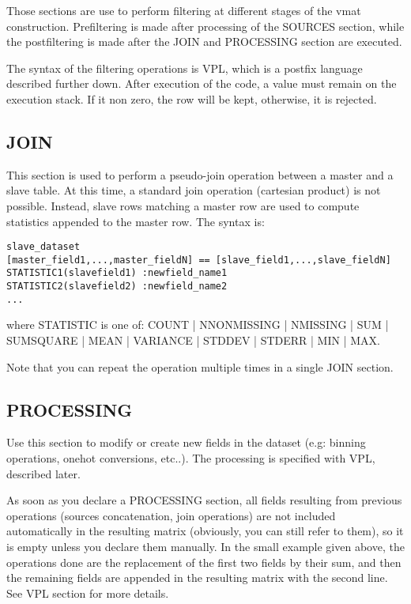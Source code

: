 \documentclass[11pt]{book}
\begin{document}
Those sections are use to perform filtering at different stages of the vmat construction. Prefiltering is made after processing of the SOURCES section, while the postfiltering is made after the JOIN and PROCESSING section are executed. 

The syntax of the filtering operations is VPL, which is a postfix language described further down. After execution of the code, a value must remain on the execution stack. If it non zero, the row will be kept, otherwise, it is rejected.

\subsection{JOIN}

This section is used to perform a pseudo-join operation between a master and a slave table. At this time, a standard join operation (cartesian product) is not possible. Instead, slave rows matching a master row are used to compute statistics appended to the master row. The syntax is:

\begin{verbatim}
slave_dataset
[master_field1,...,master_fieldN] == [slave_field1,...,slave_fieldN]
STATISTIC1(slavefield1) :newfield_name1
STATISTIC2(slavefield2) :newfield_name2
...
\end{verbatim}
where STATISTIC is one of: {COUNT | NNONMISSING | NMISSING | SUM | SUMSQUARE | MEAN | VARIANCE | STDDEV | STDERR | MIN | MAX}. 

Note that you can repeat the operation multiple times in a single JOIN section.

\subsection{PROCESSING}
Use this section to modify or create new fields in the dataset (e.g: binning operations, onehot conversions, etc..). The processing is specified with VPL, described later.

As soon as you declare a PROCESSING section, all fields resulting from previous operations (sources concatenation, join operations) are not included automatically in the resulting matrix (obviously, you can still refer to them), so it is empty unless you declare them manually. In the small example given above, the operations done are the replacement of the first two fields by their sum, and then the remaining fields are appended in the resulting matrix with the second line. See VPL section for more details.
\end{document}
